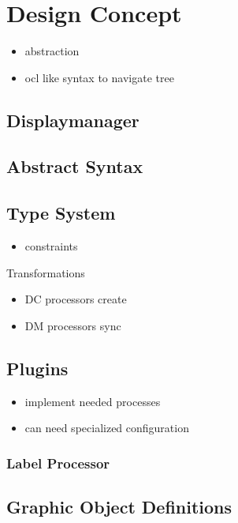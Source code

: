 \chapter{Design Concept}


\begin{itemize}
  \item abstraction
  \item ocl like syntax to navigate tree
\end{itemize}


\section{Displaymanager}
\cite{baar_correctly_2008}


\section{Abstract Syntax}

\section{Type System}
\begin{itemize}
  \item constraints
\end{itemize}

Transformations

\begin{itemize}
  \item DC processors create
  \item DM processors sync
\end{itemize}

\section{Plugins}
\begin{itemize}
  \item implement needed processes
  \item can need specialized configuration
\end{itemize}
\subsection{Label Processor}


\section{Graphic Object Definitions}